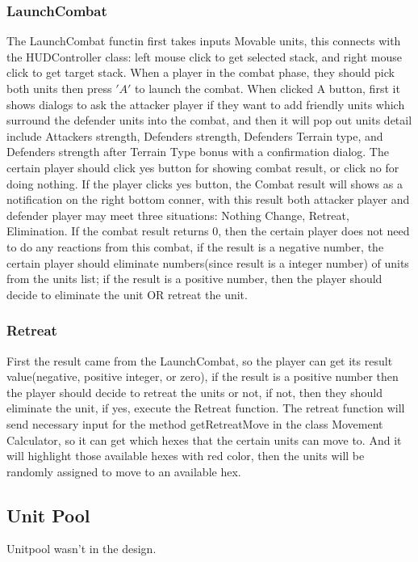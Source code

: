 \documentclass[12pt,a4paper]{article}
\begin{document}
\subsubsection{LaunchCombat}
The LaunchCombat functin first takes inputs Movable units, this connects with the HUDController class: left mouse click to get selected stack, and right mouse click to get target stack. When a player in the combat phase, they should pick both units then press $'A'$ to launch the combat. When clicked A button, first it shows dialogs to ask the attacker player if they want to add friendly units which surround the defender units into the combat, and then it will pop out units detail include Attackers strength, Defenders strength, Defenders Terrain type, and Defenders strength after Terrain Type bonus with a confirmation dialog. The certain player should click yes button for showing combat result, or click no for doing nothing. If the player clicks yes button, the Combat result will shows as a notification on the right bottom conner, with this result both attacker player and defender player may meet three situations: Nothing Change, Retreat, Elimination. If the combat result returns 0, then the certain player does not need to do any reactions from this combat, if the result is a negative number, the certain player should eliminate numbers(since result is a integer number) of units from the units list; if the result is a positive number, then the player should decide to eliminate the unit OR retreat the unit.\\

\subsubsection{Retreat}
First the result came from the LaunchCombat, so the player can get its result value(negative, positive integer, or zero), if the result is a positive number then the player should decide to retreat the units or not, if not, then they should eliminate the unit, if yes, execute the Retreat function. The retreat function will send necessary input for the method getRetreatMove in the class Movement Calculator, so it can get which hexes that the certain units can move to. And it will highlight those available hexes with red color, then the units will be randomly assigned to move to an available hex.

\subsection{Unit Pool}
Unitpool wasn't in the design.
\end{document}

